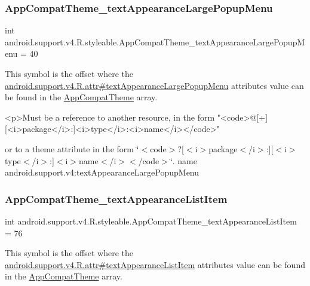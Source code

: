 \subsubsection{\texorpdfstring{App\+Compat\+Theme\+\_\+text\+Appearance\+Large\+Popup\+Menu}{AppCompatTheme\_textAppearanceLargePopupMenu}}
{\footnotesize\ttfamily int android.\+support.\+v4.\+R.\+styleable.\+App\+Compat\+Theme\+\_\+text\+Appearance\+Large\+Popup\+Menu = 40\hspace{0.3cm}{\ttfamily [static]}}

This symbol is the offset where the \hyperlink{classandroid_1_1support_1_1v4_1_1R_1_1attr_ac95ce759329fc855718c6b3a61a764d8}{android.\+support.\+v4.\+R.\+attr\#text\+Appearance\+Large\+Popup\+Menu} attribute\textquotesingle{}s value can be found in the \hyperlink{classandroid_1_1support_1_1v4_1_1R_1_1styleable_ac07ebbe62ed977f6dcaadc6397840ace}{App\+Compat\+Theme} array.

\begin{DoxyVerb}      <p>Must be a reference to another resource, in the form "<code>@[+][<i>package</i>:]<i>type</i>:<i>name</i></code>"
\end{DoxyVerb}
 or to a theme attribute in the form \char`\"{}$<$code$>$?\mbox{[}$<$i$>$package$<$/i$>$\+:\mbox{]}\mbox{[}$<$i$>$type$<$/i$>$\+:\mbox{]}$<$i$>$name$<$/i$>$$<$/code$>$\char`\"{}.  name android.\+support.\+v4\+:text\+Appearance\+Large\+Popup\+Menu \mbox{\label{classandroid_1_1support_1_1v4_1_1R_1_1styleable_afb0912c36e3e09d6a8e93507b65bf499}} 
\subsubsection{\texorpdfstring{App\+Compat\+Theme\+\_\+text\+Appearance\+List\+Item}{AppCompatTheme\_textAppearanceListItem}}
{\footnotesize\ttfamily int android.\+support.\+v4.\+R.\+styleable.\+App\+Compat\+Theme\+\_\+text\+Appearance\+List\+Item = 76\hspace{0.3cm}{\ttfamily [static]}}

This symbol is the offset where the \hyperlink{classandroid_1_1support_1_1v4_1_1R_1_1attr_aa6652e8f8f1055a205e3cf8a931aa2ef}{android.\+support.\+v4.\+R.\+attr\#text\+Appearance\+List\+Item} attribute\textquotesingle{}s value can be found in the \hyperlink{classandroid_1_1support_1_1v4_1_1R_1_1styleable_ac07ebbe62ed977f6dcaadc6397840ace}{App\+Compat\+Theme} array.

